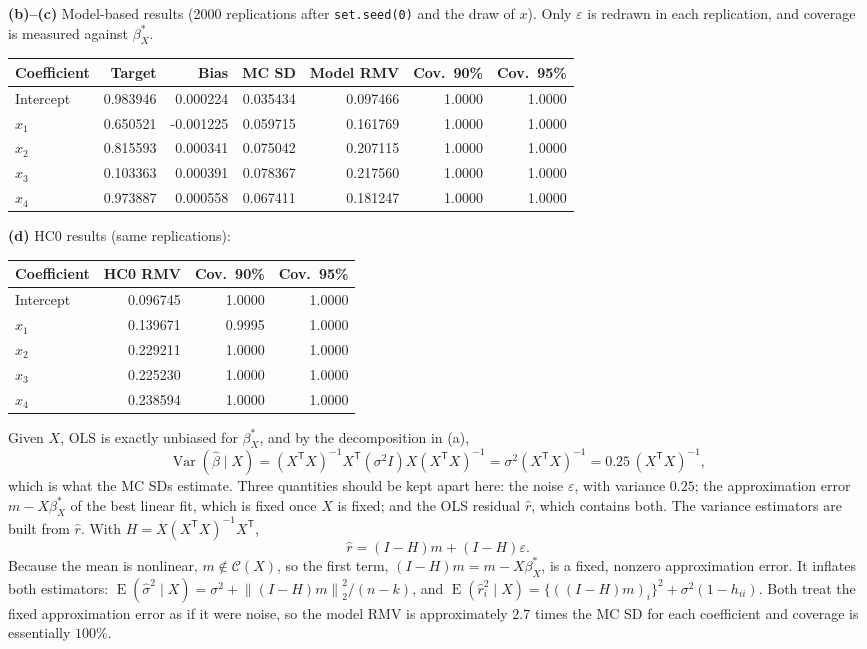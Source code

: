 \documentclass[answers,12pt,addpoints]{exam}
\providecommand{\E}{\operatorname{E}}
\newcommand{\trans}{^{\mathsf T}}
\newcommand{\normtwo}[1]{\left\lVert #1\right\rVert_2}
\newcommand{\col}{\mathcal{C}}
\begin{document}
\begin{questions}
\begin{solution}
\textbf{(b)--(c)} Model-based results (2000 replications after
\texttt{set.seed(0)} and the draw of $x$). Only $\varepsilon$ is redrawn in each
replication, and coverage is measured against $\beta_X^*$.
\begin{center}
\small
\setlength{\tabcolsep}{4pt}
\begin{tabular}{lrrrrrr}
\toprule
Coefficient & Target & Bias & MC SD & Model RMV & Cov.\ 90\% & Cov.\ 95\%\\
\midrule
Intercept & 0.983946 &  0.000224 & 0.035434 & 0.097466 & 1.0000 & 1.0000\\
$x_1$     & 0.650521 & -0.001225 & 0.059715 & 0.161769 & 1.0000 & 1.0000\\
$x_2$     & 0.815593 &  0.000341 & 0.075042 & 0.207115 & 1.0000 & 1.0000\\
$x_3$     & 0.103363 &  0.000391 & 0.078367 & 0.217560 & 1.0000 & 1.0000\\
$x_4$     & 0.973887 &  0.000558 & 0.067411 & 0.181247 & 1.0000 & 1.0000\\
\bottomrule
\end{tabular}
\end{center}
 
\textbf{(d)} HC0 results (same replications):
\begin{center}
\begin{tabular}{lrrr}
\toprule
Coefficient & HC0 RMV & Cov.\ 90\% & Cov.\ 95\%\\
\midrule
Intercept & 0.096745 & 1.0000 & 1.0000\\
$x_1$     & 0.139671 & 0.9995 & 1.0000\\
$x_2$     & 0.229211 & 1.0000 & 1.0000\\
$x_3$     & 0.225230 & 1.0000 & 1.0000\\
$x_4$     & 0.238594 & 1.0000 & 1.0000\\
\bottomrule
\end{tabular}
\end{center}
Given $X$, OLS is exactly unbiased for $\beta_X^*$, and by the decomposition
in (a),
\[
\operatorname{Var}(\widehat\beta\mid X)
=(X\trans X)^{-1}X\trans(\sigma^2I)X(X\trans X)^{-1}
=\sigma^2(X\trans X)^{-1}=0.25\,(X\trans X)^{-1},
\]
which is what the MC SDs estimate. Three quantities should be kept apart
here: the noise $\varepsilon$, with variance $0.25$; the approximation error
$m-X\beta_X^*$ of the best linear fit, which is fixed once $X$ is fixed;
and the OLS residual $\widehat r$, which contains both. The variance
estimators are built from $\widehat r$. With $H=X(X\trans X)^{-1}X\trans$,
\[
\widehat r=(I-H)m+(I-H)\varepsilon .
\]
Because the mean is nonlinear, $m\notin\col(X)$, so the first term,
$(I-H)m=m-X\beta_X^*$, is a fixed, nonzero approximation error. It inflates both estimators:
$\E(\widehat\sigma^2\mid X)=\sigma^2+\normtwo{(I-H)m}^2/(n-k)$, and
$\E(\widehat r_i^2\mid X)=\{((I-H)m)_i\}^2+\sigma^2(1-h_{ii})$. Both treat the
fixed approximation error as if it were noise, so the model RMV is approximately $2.7$
times the MC SD for each coefficient and coverage is essentially $100\%$.
 

\end{solution}
\end{questions}
\end{document}

